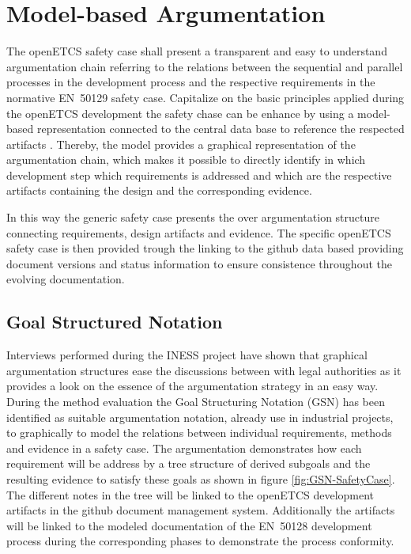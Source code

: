 \documentclass{template/openetcs_report}
\begin{document}
\section{Model-based Argumentation}
\label{sec:safetycase-model}

The openETCS safety case shall present a transparent and easy to understand argumentation chain referring to the relations between the sequential and parallel processes in the development process and the respective requirements in the normative EN~50129 safety case. Capitalize on the basic principles applied during the openETCS development the safety chase can be enhance by using a model-based representation connected to the central data base to reference the respected artifacts \cite{Muller.2010}. Thereby, the model provides a graphical representation of the argumentation chain, which makes it possible to directly identify in which development step which requirements is addressed and which are the respective artifacts containing the design and the corresponding evidence. 

In this way the generic safety case presents the over argumentation structure connecting requirements, design artifacts and evidence. The specific openETCS safety case is then provided trough the linking to the github data based providing document versions and status information to ensure consistence throughout the evolving documentation.

\subsection{Goal Structured Notation}

Interviews performed during the INESS project have shown that graphical argumentation structures ease the discussions between with legal authorities as it provides a look on the essence of the argumentation strategy in an easy way. During the method evaluation the Goal Structuring Notation (GSN) \cite{Kelly.2004thegoal, GSNwebsite} has been identified as suitable argumentation notation, already use in industrial projects, to  graphically  to model the relations between individual requirements, methods and evidence in a safety case. The argumentation demonstrates how each requirement will be address by a tree structure of derived subgoals and the resulting evidence to satisfy these goals as shown in figure \ref{fig:GSN-SafetyCase}. The different notes in the tree will be linked to the openETCS development artifacts in the github document management system. Additionally the artifacts will be linked to the modeled documentation of the EN~50128 development process during the corresponding phases to demonstrate the process conformity. 
 
\end{document}
